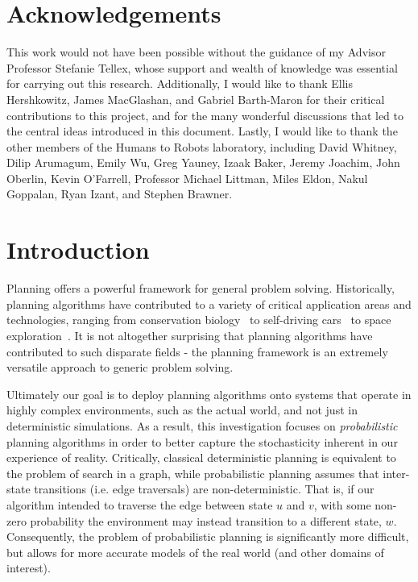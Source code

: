 \documentclass[11pt]{article}
\begin{document}
\newpage

\section*{Acknowledgements}
This work would not have been possible without the guidance of my Advisor Professor Stefanie Tellex, whose support and wealth of knowledge was essential for carrying out this research. Additionally, I would like to thank Ellis Hershkowitz, James MacGlashan, and Gabriel Barth-Maron for their critical contributions to this project, and for the many wonderful discussions that led to the central ideas introduced in this document. Lastly, I would like to thank the other members of the Humans to Robots laboratory, including David Whitney, Dilip Arumagum, Emily Wu, Greg Yauney, Izaak Baker, Jeremy Joachim, John Oberlin, Kevin O'Farrell, Professor Michael Littman, Miles Eldon, Nakul Goppalan, Ryan Izant, and Stephen Brawner.

\newpage
\tableofcontents
\newpage

\section{Introduction}
\label{sec:introduction}

Planning offers a powerful framework for general problem solving. Historically, planning algorithms have contributed to a variety of critical application areas and technologies, ranging from conservation biology~\cite{possingham1997state} to self-driving cars~\cite{thrun2006stanley,montemerlo2008junior} to space exploration~\cite{bresina2005activity,backes1999automated,chien2000aspen}. It is not altogether surprising that planning algorithms have contributed to such disparate fields - the planning framework is an extremely versatile approach to generic problem solving.

Ultimately our goal is to deploy planning algorithms onto systems that operate in highly complex environments, such as the actual world, and not just in deterministic simulations. As a result, this investigation focuses on {\it probabilistic} planning algorithms in order to better capture the stochasticity inherent in our experience of reality. Critically, classical deterministic planning is equivalent to the problem of search in a graph, while probabilistic planning assumes that inter-state transitions (i.e. edge traversals) are non-deterministic. That is, if our algorithm intended to traverse the edge between state $u$ and $v$, with some non-zero probability the environment may instead transition to a different state, $w$. Consequently, the problem of probabilistic planning is significantly more difficult, but allows for more accurate models of the real world (and other domains of interest).
\end{document}
